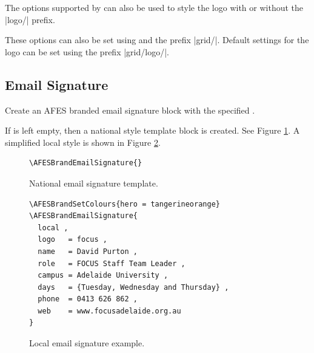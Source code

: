 \documentclass[a4paper]{l3doc}
\begin{document}
The options supported by  can also be used to style the logo
with or without the |logo/| prefix.

These options can also be set using  and the prefix
|grid/|. Default settings for the logo can be set using the prefix
|grid/logo/|.

\subsection{Email Signature}

\begin{function}{\AFESBrandEmailSignature}
  \begin{syntax}
  \end{syntax}
  Create an AFES branded email signature block with the specified
  .
\end{function}

If  is left empty, then a national style template block is
created. See Figure \ref{nationalemail}. A simplified local style is shown in
Figure \ref{localemail}.

\begin{figure}
  \begin{lstlisting}
\AFESBrandEmailSignature{}
  \end{lstlisting}
  \centering
  \caption{National email signature template.}\label{nationalemail}
\end{figure}

\begin{figure}
  \begin{lstlisting}
\AFESBrandSetColours{hero = tangerineorange}
\AFESBrandEmailSignature{
  local ,
  logo   = focus ,
  name   = David Purton ,
  role   = FOCUS Staff Team Leader ,
  campus = Adelaide University ,
  days   = {Tuesday, Wednesday and Thursday} ,
  phone  = 0413 626 862 ,
  web    = www.focusadelaide.org.au
}
  \end{lstlisting}
  \centering
  \caption{Local email signature example.}\label{localemail}
\end{figure}
\end{document}
